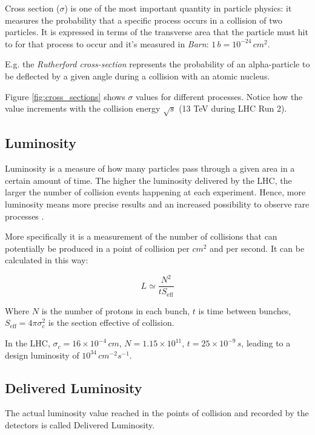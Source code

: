 Cross section ($\sigma$) is one of the most important quantity in particle physics: it measures the probability that a specific process occurs in a collision of two particles. It is expressed in terms of the transverse area that the particle must hit to for that process to occur and it's measured in \textit{Barn}: $1\, b = 10^{-24} \,cm^2$.

E.g. the \textit{Rutherford cross-section} represents the probability of an alpha-particle to be deflected by a given angle during a collision with an atomic nucleus.


Figure \ref{fig:cross_sections} shows $\sigma$ values for different processes. Notice how the value increments with the collision energy $\sqrt s$ (13 TeV during LHC Run 2).

\subsection{Luminosity}

Luminosity is a measure of how many particles pass through a given area in a certain amount of time. The higher the luminosity delivered by the LHC, the larger the number of collision events happening at each experiment. Hence, more luminosity means more precise results and an increased possibility to observe rare processes \cite{CERNGlossary}.

More specifically it is a measurement of the number of collisions that can potentially be produced in a point of collision per $cm^2$ and per second. It can be calculated in this way:

\begin{equation}
	L \simeq  \frac{N^2}{t S_{\text{eff}}}
\end{equation}

Where $N$ is the number of protons in each bunch, $t$ is time between bunches, $S_{\text{eff}} = 4 \pi \sigma_c^2$ is the section effective of collision.

In the LHC, $\sigma _c= 16\times 10^{-4}\, cm$, $N = 1.15\times10^{11}$, $t = 25 \times 10^{-9}\, s$, leading to a design luminosity of $10^{34}\, cm^{-2}s^{-1}$.

\subsection{Delivered Luminosity}

The actual luminosity value reached in the points of collision and recorded by the detectors is called Delivered Luminosity.

